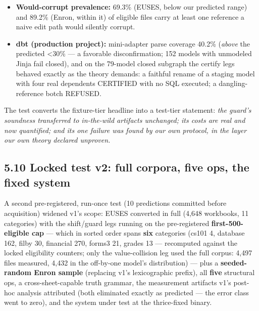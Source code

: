 \documentclass[
  11pt,
]{article}
\begin{document}
\begin{itemize}
  converted exotica. This is the honest price of soundness on real
  artifacts, and we report it as such rather than tuning it away
  post-hoc.
\item
  \textbf{Would-corrupt prevalence:} 69.3\% (EUSES, below our predicted
  range) and 89.2\% (Enron, within it) of eligible files carry at least
  one reference a naive edit path would silently corrupt.
\item
  \textbf{dbt (production project):} mini-adapter parse coverage 40.2\%
  (\emph{above} the predicted \textless30\% --- a favorable
  disconfirmation; 152 models with unmodeled Jinja fail closed), and on
  the 79-model closed subgraph the certify legs behaved exactly as the
  theory demands: a faithful rename of a staging model with four real
  dependents CERTIFIED with no SQL executed; a dangling-reference botch
  REFUSED.
\end{itemize}

The test converts the fixture-tier headline into a test-tier statement:
\emph{the guard's soundness transferred to in-the-wild artifacts
unchanged; its costs are real and now quantified; and its one failure
was found by our own protocol, in the layer our own theory declared
unproven.}

\subsection{5.10 Locked test v2: full corpora, five ops, the fixed
system}\label{locked-test-v2-full-corpora-five-ops-the-fixed-system}

A second pre-registered, run-once test (10 predictions committed before
acquisition) widened v1's scope: EUSES converted in full (4,648
workbooks, 11 categories) with the shift/guard legs running on the
pre-registered \textbf{first-500-eligible cap} --- which in sorted order
spans \textbf{six} categories (cs101 4, database 162, filby 30,
financial 270, forms3 21, grades 13 --- recomputed against the locked
eligibility counters; only the value-collision leg used the full corpus:
4,497 files measured, 4,432 in the off-by-one model's distribution) ---
plus a \textbf{seeded-random Enron sample} (replacing v1's lexicographic
prefix), all \textbf{five} structural ops, a cross-sheet-capable truth
grammar, the measurement artifacts v1's post-hoc analysis attributed
(both eliminated exactly as predicted --- the error class went to zero),
and the system under test at the thrice-fixed binary.
\end{document}
